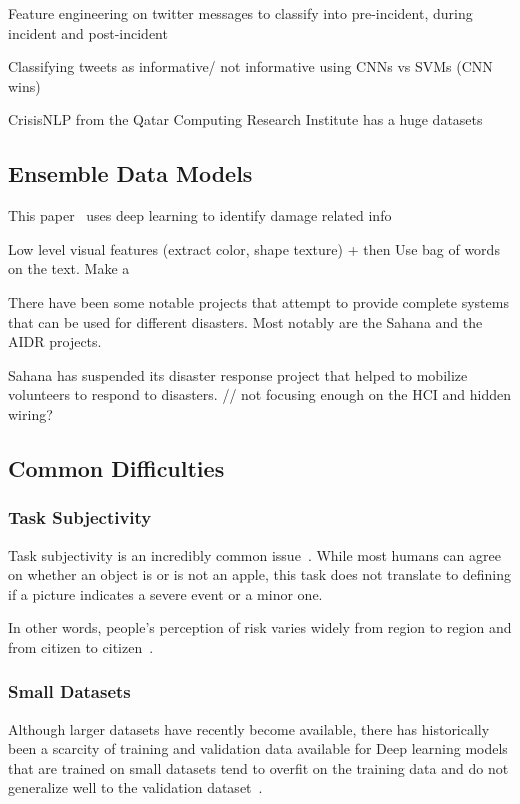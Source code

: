 Feature engineering on twitter messages to classify into pre-incident, during
incident and post-incident
\cite{chowdhuryTweet4actUsingIncidentspecific2013}

Classifying tweets as informative/ not informative using CNNs vs SVMs (CNN wins)
\cite{carageaIdentifyingInformativeMessages2016}

CrisisNLP from the Qatar Computing Research Institute
has a huge datasets
\cite{nguyenRapidClassificationCrisisRelated}


\subsection{Ensemble Data Models}

This paper~\cite{mouzannarDamageIdentificationSocial2018} uses deep learning to
identify damage related info 

Low level visual features (extract color, shape texture) + then Use bag of words
on the text. Make a 
\cite{jomaaSemanticVisualCues2016}

There have been some notable projects that attempt to provide complete systems
that can be used for different disasters. Most notably are the Sahana and the
AIDR projects.

Sahana has suspended its disaster response project that helped to
mobilize volunteers to respond to disasters.
// not focusing enough on the HCI and hidden wiring?


\subsection{Common Difficulties}
\subsubsection{Task Subjectivity}
Task subjectivity is an incredibly common
issue~\cite{nguyenDamageAssessmentSocial2017,
quarantelliUrbanVulnerabilityDisasters2003}. While most humans can agree on
whether an object is or is not an apple, this task does not translate to
defining if a picture indicates a severe event or a minor one. 

In other words, people's perception of risk varies widely from region to region
and from citizen to citizen~\cite{quarantelliUrbanVulnerabilityDisasters2003}.

\subsubsection{Small Datasets}
Although larger datasets have recently become available, there has
historically been a scarcity of training and validation data available for
Deep learning models that are trained on small datasets tend to overfit on the
training data and do not generalize well to the validation
dataset~\cite{perezEffectivenessDataAugmentation2017}.

